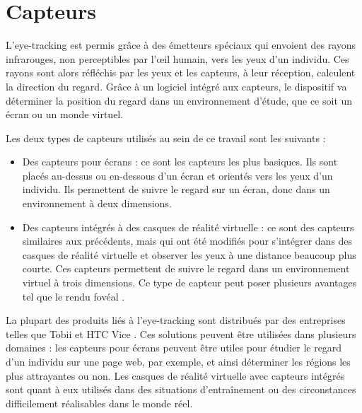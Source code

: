 \documentclass[hidelinks,12pt]{article}
\begin{document}

\section{Capteurs}

L'eye-tracking est permis grâce à des émetteurs spéciaux qui envoient des rayons
infrarouges, non perceptibles par l'œil humain, vers les yeux d'un individu.
Ces rayons sont alors réfléchis par les yeux et les capteurs, à leur réception,
calculent la direction du regard. Grâce à un logiciel intégré aux capteurs, le
dispositif va déterminer la position du regard dans un environnement d'étude,
que ce soit un écran ou un monde virtuel.

\bigskip
Les deux types de capteurs utilisés au sein de ce travail sont les suivants :
\begin{itemize}
  \item Des capteurs pour écrans : ce sont les capteurs les plus basiques. Ils
        sont placés au-dessus ou en-dessous d'un écran et orientés vers les yeux
        d'un individu. Ils permettent de suivre le regard sur un écran, donc
        dans un environnement à deux dimensions.
  \item Des capteurs intégrés à des casques de réalité virtuelle : ce sont des
        capteurs similaires aux précédents, mais qui ont été modifiés pour
        s'intégrer dans des casques de réalité virtuelle et observer les yeux à
        une distance beaucoup plus courte. Ces capteurs permettent de suivre le
        regard dans un environnement virtuel à trois dimensions. Ce type de
        capteur peut poser plusieurs avantages tel que le rendu fovéal
        \cite{wiki_foveated_rendering}.
\end{itemize}

\bigskip
La plupart des produits liés à l'eye-tracking sont distribués par des
entreprises telles que Tobii \cite{tobii} et HTC Vice \cite{htc_vive_pro_eye}.
Ces solutions peuvent être utilisées dans plusieurs domaines \cite{yt_tobii_vr}
: les capteurs pour écrans peuvent être utiles pour étudier le regard d'un
individu sur une page web, par exemple, et ainsi déterminer les régions les
plus attrayantes ou non. Les casques de réalité virtuelle avec capteurs
intégrés sont quant à eux utilisés dans des situations d'entraînement ou des
circonstances difficilement réalisables dans le monde réel.
\end{document}
